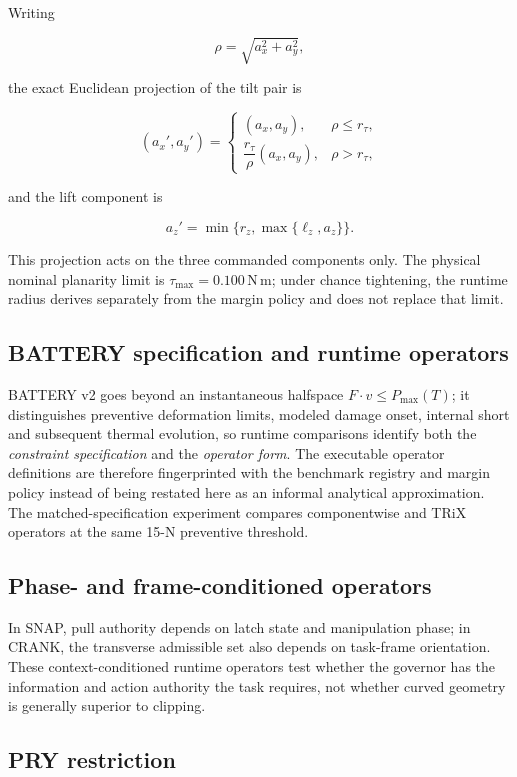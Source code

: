 \documentclass[10pt]{article}
\begin{document}
Writing

\[
\rho=\sqrt{a_x^2+a_y^2},
\]

the exact Euclidean projection of the tilt pair is

\[
(a_x',a_y')
=
\begin{cases}
(a_x,a_y), & \rho\leq r_\tau,\\[4pt]
\dfrac{r_\tau}{\rho}(a_x,a_y), & \rho>r_\tau,
\end{cases}
\]

and the lift component is

\[
a_z'=\min\{r_z,\max\{\ell_z,a_z\}\}.
\]

This projection acts on the three commanded components only. The physical nominal planarity
limit is $\tau_{\max}=0.100\,\mathrm{N\,m}$; under chance tightening, the
runtime radius derives separately from the margin policy and does not replace that limit.


\subsection{BATTERY specification and runtime operators}

BATTERY v2 goes beyond an instantaneous halfspace $F\cdot v\leq P_{\max}(T)$; it distinguishes preventive
deformation limits, modeled damage onset, internal short and subsequent thermal
evolution, so runtime comparisons identify both the \emph{constraint
specification} and the \emph{operator form}. The executable operator
definitions are therefore fingerprinted with the benchmark registry and margin
policy instead of being restated here as an informal analytical approximation. The
matched-specification experiment compares componentwise and TRiX operators at
the same 15-N preventive threshold.


\subsection{Phase- and frame-conditioned operators}

In SNAP, pull authority depends on latch state and manipulation phase; in
CRANK, the transverse admissible set also depends on task-frame orientation.
These context-conditioned runtime operators test whether the governor has the
information and action authority the task requires, not whether curved
geometry is generally superior to clipping.


\subsection{PRY restriction}
\end{document}
